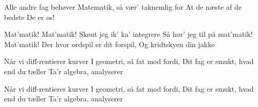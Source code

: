 \documentclass[a4paper,11pt]{article}
\begin{document}
\begin{song}
 Alle andre fag behøver
Matematik, så vær’ taknemlig for
At de næste af de bedste
De er os!
 
 Mat’matik! Mat’matik!
Skønt jeg ik’ ka’ integrere
Så hør’ jeg til på mat’matik! Mat’matik!
Der hvor ordspil er dit forspil,
Og kridtskyen din jakke
 
 Når vi diff-rentierer kurver
I geometri, så fat mod fordi,
Dit fag er smukt, hvad end du tæller
Ta’r algebra, analyserer
 
 Når vi diff-rentierer kurver
I geometri, så fat mod fordi,
Dit fag er smukt, hvad end du tæller
Ta’r algebra, analyserer





\end{song}
\end{document}
